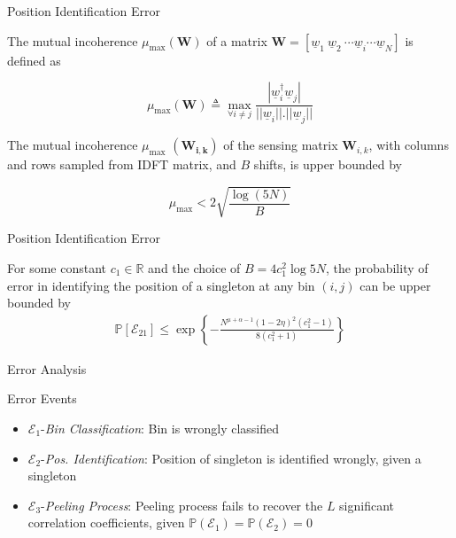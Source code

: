 \documentclass[10pt,xcolor=table]{beamer}
\newcommand{\defeq}{\triangleq}
\newcommand{\mc}{\mathcal}
\newcommand{\mbb}{\mathbb}
\newcommand{\wv}{\underline{w}}
\begin{document}
\begin{frame}{Position Identification Error}
\begin{definition}
	The mutual incoherence $\mu_{\text{max}}( \mathbf{W})$ of a matrix $\mathbf{W} = [\wv_1 ~ \wv_2 ~ \cdots \wv_i \cdots \wv_N ]$ is defined as 
	
	\[\mu_{\text{max}}(\mathbf{W}) \defeq \max \limits_{\forall i \neq j} \frac{|\wv_i^{\dagger} \wv_j |}{||\wv_i || . ||\wv_j ||} \]
\end{definition}

\begin{lemma}
	The mutual incoherence $\mu_{\text{max}}$ $(\mathbf{W_{i,k}})$ of the sensing matrix $\mathbf{W}_{i,k}$, with columns and rows sampled from IDFT matrix, and  $B$ shifts, is upper bounded by
	
	\[ \mu_{\text{max}} < 2\sqrt{\frac{\log(5N)}{B}} \] 
\end{lemma}
\end{frame}




\begin{frame}{Position Identification Error}

\begin{lemma}
	For some constant $c_1 \in \mathbb{R}$ and the choice of $B=4c_1^2\log 5N$,  the probability of error in identifying the position of a singleton at any bin $(i,j)$ can be upper bounded by
	\begin{align*}
	\mbb{P}[\mc{E}_{21}]\leq \exp\left\lbrace-\frac{N^{\mu+\alpha-1}(1-2\eta)^2(c_1^2-1)}{8(c_1^2+1)}\right\rbrace
	\end{align*}
\end{lemma}

\end{frame}


\begin{frame}{Error Analysis}

\begin{block}{Error Events}
\begin{itemize}\small
	\item {\color{blue}$\mathcal{E}_1${-\it Bin Classification}}: Bin is wrongly classified
	\item {\color{blue}$\mathcal{E}_2${-\it Pos. Identification}}: Position of singleton is identified wrongly, given a singleton
	\item {\color{red}$\mathcal{E}_3${-\it Peeling Process}}: Peeling process fails to recover the $L$ significant correlation coefficients, given $\mbb{P}(\mc{E}_1)= \mbb{P}(\mc{E}_2)=0$
\end{itemize}
\end{block}
\end{frame}
\end{document}
